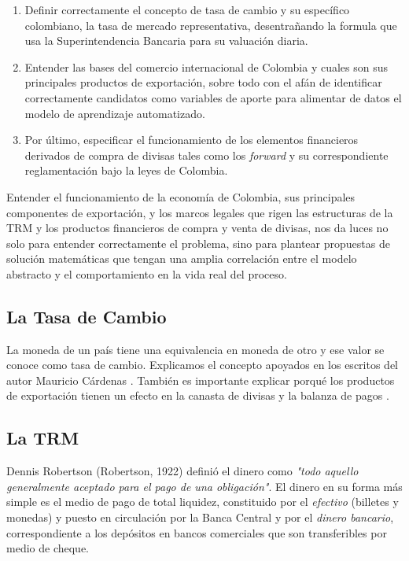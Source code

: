 \begin{spacing}{1.5}
\begin{enumerate}
	\item Definir correctamente el concepto de tasa de cambio y su específico colombiano, la tasa de mercado representativa, desentrañando la formula que usa la Superintendencia Bancaria para su valuación diaria.
	\item Entender las bases del comercio internacional de Colombia y cuales son sus principales productos de exportación, sobre todo con el afán de identificar correctamente candidatos como variables de aporte para alimentar de datos el modelo de aprendizaje automatizado. 
	\item Por último, especificar el funcionamiento de los elementos financieros derivados de compra de divisas tales como los \emph{forward} y su correspondiente reglamentación bajo la leyes de Colombia. 
\end{enumerate}

Entender el funcionamiento de la economía de Colombia, sus principales componentes de exportación, y los marcos legales que rigen las estructuras de la TRM y los productos financieros de compra y venta de divisas, nos da luces no solo para entender correctamente el problema, sino para plantear propuestas de solución matemáticas que tengan una amplia correlación entre el modelo abstracto y el comportamiento en la vida real del proceso. 

\subsection{La Tasa de Cambio}
La moneda de un país tiene una equivalencia en moneda de otro y ese valor se conoce como tasa de cambio. Explicamos el concepto apoyados en los escritos del autor Mauricio Cárdenas \cite{cardenas}. También es importante explicar porqué los productos de exportación tienen un efecto en la canasta de divisas y la balanza de pagos \cite{crisisCambiarias}.   

\subsection{La TRM}
Dennis Robertson (Robertson, 1922) definió el dinero como \textit{"todo aquello generalmente aceptado para el pago de una obligación"}. El dinero en su forma más simple es el medio de pago de total liquidez, constituido por el \textit{efectivo} (billetes y monedas) y puesto en circulación por la Banca Central y por el \textit{dinero bancario}, correspondiente a los depósitos en bancos comerciales que son transferibles por medio de cheque. 


\end{spacing}
